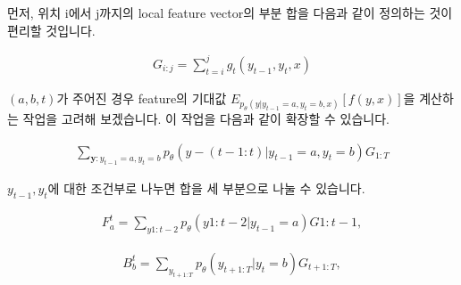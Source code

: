 \documentclass{article}
\begin{document}
먼저, 위치 i에서 j까지의 local feature vector의 부분 합을 다음과 같이 정의하는 것이 편리할 것입니다.

\begin{align}
  G_{i:j} = \sum_{t=i}^{j} g_t(y_{t-1}, y_{t}, x)
\end{align}

$(a, b, t)$가 주어진 경우 feature의 기대값 $E_{p_\theta(y|y_{t-1}=a, y_t=b, x)}[f(y, x)]$을 계산하는 작업을 고려해 보겠습니다. 이 작업을 다음과 같이 확장할 수 있습니다.

\begin{align*}
    \sum_{\textbf{y}: y_{t-1}=a, y_t=b} p_\theta(y-(t-1:t) | y_{t-1} = a, y_t = b) G_{1:T}
\end{align*}

$y_{t-1}, y_t$에 대한 조건부로 나누면 합을 세 부분으로 나눌 수 있습니다.

\begin{align}
    F_a^t = \sum_{y1:t-2} p_\theta(y1:t-2 | y_{t-1} = a) G1:t-1,
\end{align}
    
\begin{align}
    B_b^t = \sum_{y_{t+1:T}} p_\theta(y_{t+1:T} | y_t = b) G_{t+1:T},
\end{align}
\end{document}
